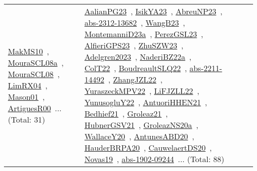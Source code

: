 {\begin{longtable}{lp{3cm}>{\raggedright\arraybackslash}p{6cm}>{\raggedright\arraybackslash}p{6cm}>{\raggedright\arraybackslash}p{8cm}}
\href{works/MakMS10.pdf}{MakMS10}~\cite{MakMS10}, \href{works/MouraSCL08a.pdf}{MouraSCL08a}~\cite{MouraSCL08a}, \href{works/MouraSCL08.pdf}{MouraSCL08}~\cite{MouraSCL08}, \href{works/LimRX04.pdf}{LimRX04}~\cite{LimRX04}, \href{works/Mason01.pdf}{Mason01}~\cite{Mason01}, \href{works/ArtiguesR00.pdf}{ArtiguesR00}~\cite{ArtiguesR00}... (Total: 31) & \href{works/AalianPG23.pdf}{AalianPG23}~\cite{AalianPG23}, \href{works/IsikYA23.pdf}{IsikYA23}~\cite{IsikYA23}, \href{works/AbreuNP23.pdf}{AbreuNP23}~\cite{AbreuNP23}, \href{works/abs-2312-13682.pdf}{abs-2312-13682}~\cite{abs-2312-13682}, \href{works/WangB23.pdf}{WangB23}~\cite{WangB23}, \href{works/MontemanniD23a.pdf}{MontemanniD23a}~\cite{MontemanniD23a}, \href{works/PerezGSL23.pdf}{PerezGSL23}~\cite{PerezGSL23}, \href{works/AlfieriGPS23.pdf}{AlfieriGPS23}~\cite{AlfieriGPS23}, \href{works/ZhuSZW23.pdf}{ZhuSZW23}~\cite{ZhuSZW23}, \href{works/Adelgren2023.pdf}{Adelgren2023}~\cite{Adelgren2023}, \href{works/NaderiBZ22a.pdf}{NaderiBZ22a}~\cite{NaderiBZ22a}, \href{works/ColT22.pdf}{ColT22}~\cite{ColT22}, \href{works/BoudreaultSLQ22.pdf}{BoudreaultSLQ22}~\cite{BoudreaultSLQ22}, \href{works/abs-2211-14492.pdf}{abs-2211-14492}~\cite{abs-2211-14492}, \href{works/ZhangJZL22.pdf}{ZhangJZL22}~\cite{ZhangJZL22}, \href{works/YuraszeckMPV22.pdf}{YuraszeckMPV22}~\cite{YuraszeckMPV22}, \href{works/LiFJZLL22.pdf}{LiFJZLL22}~\cite{LiFJZLL22}, \href{works/YunusogluY22.pdf}{YunusogluY22}~\cite{YunusogluY22}, \href{works/AntuoriHHEN21.pdf}{AntuoriHHEN21}~\cite{AntuoriHHEN21}, \href{works/Bedhief21.pdf}{Bedhief21}~\cite{Bedhief21}, \href{works/Groleaz21.pdf}{Groleaz21}~\cite{Groleaz21}, \href{works/HubnerGSV21.pdf}{HubnerGSV21}~\cite{HubnerGSV21}, \href{works/GroleazNS20a.pdf}{GroleazNS20a}~\cite{GroleazNS20a}, \href{works/WallaceY20.pdf}{WallaceY20}~\cite{WallaceY20}, \href{works/AntunesABD20.pdf}{AntunesABD20}~\cite{AntunesABD20}, \href{works/HauderBRPA20.pdf}{HauderBRPA20}~\cite{HauderBRPA20}, \href{works/CauwelaertDS20.pdf}{CauwelaertDS20}~\cite{CauwelaertDS20}, \href{works/Novas19.pdf}{Novas19}~\cite{Novas19}, \href{works/abs-1902-09244.pdf}{abs-1902-09244}~\cite{abs-1902-09244}... (Total: 88)\\
\end{longtable}
}

